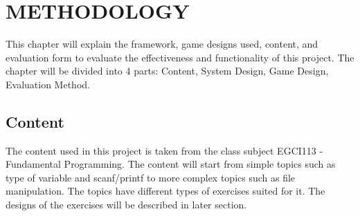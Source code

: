 \chapter{METHODOLOGY}
This chapter will explain the framework, game designs used, content, and evaluation form to evaluate the effectiveness and functionality of this project. The chapter will be divided into 4 parts: Content, System Design, Game Design, Evaluation Method.

\section{Content}
The content used in this project is taken from the class subject EGCI113 - Fundamental Programming. The content will start from simple topics such as type of variable and scanf/printf to more complex topics such as file manipulation. The topics have different types of exercises suited for it. The designs of the exercises will be described in later section.

